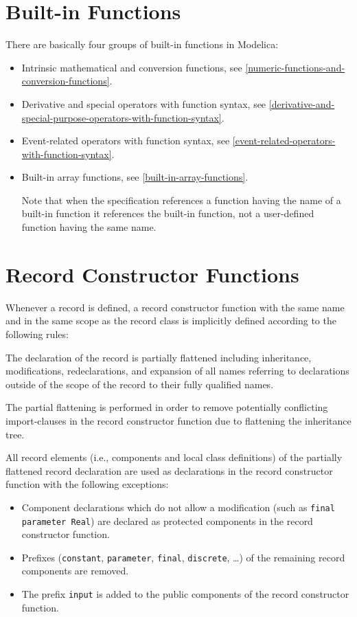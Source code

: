 \section{Built-in Functions}\label{built-in-functions}

There are basically four groups of built-in functions in Modelica:
\begin{itemize}
\item
  Intrinsic mathematical and conversion functions, see \cref{numeric-functions-and-conversion-functions}.
\item
  Derivative and special operators with function syntax,
  see \cref{derivative-and-special-purpose-operators-with-function-syntax}.
\item
  Event-related operators with function syntax, see \cref{event-related-operators-with-function-syntax}.
\item
  Built-in array functions, see \cref{built-in-array-functions}.

  Note that when the specification references a function having the name
  of a built-in function it references the built-in function, not a
  user-defined function having the same name.
\end{itemize}

\section{Record Constructor Functions}\label{record-constructor-functions}

Whenever a record is defined, a record constructor function with the
same name and in the same scope as the record class is implicitly
defined according to the following rules:

The declaration of the record is partially flattened including
inheritance, modifications, redeclarations, and expansion of all names
referring to declarations outside of the scope of the record to their
fully qualified names.

\begin{nonnormative}
The partial flattening is performed in order to remove potentially conflicting import-clauses in the record constructor function due to flattening the inheritance tree.
\end{nonnormative}

All record elements (i.e., components and local class
definitions) of the partially flattened record declaration are used
as declarations in the record constructor function with the following
exceptions:
\begin{itemize}
\item
  Component declarations which do not allow a modification (such
  as \lstinline!final parameter Real!) are declared
  as protected components in the record constructor function.
\item
  Prefixes (\lstinline!constant!, \lstinline!parameter!, \lstinline!final!, \lstinline!discrete!, \ldots) of the remaining
  record components are removed.
\item
  The prefix \lstinline!input! is added to the public components of the record
  constructor function.
\end{itemize}

